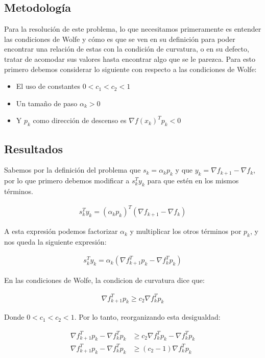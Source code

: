 \documentclass{article}
\begin{document}
\subsection{Metodología}

Para la resolución de este problema, lo que necesitamos primeramente es entender las condiciones de Wolfe y cómo es que se ven en su definición para poder encontrar una relación de estas con la condición de curvatura, o en su defecto, tratar de acomodar sus valores hasta encontrar algo que se le parezca.
Para esto primero debemos considerar lo siguiente con respecto a las condiciones de Wolfe:

\begin{itemize}
    \item El uso de constantes $0 < c_1 < c_2 < 1$
    \item Un tamaño de paso $\alpha_k > 0$
    \item Y $p_k$ como dirección de descenso es $\nabla f(x_k)^Tp_k<0$
\end{itemize}

\subsection{Resultados}
\setcounter{equation}{0}

Sabemos por la definición del problema que $s_k = \alpha_kp_k$ y que $y_k = \nabla f_{k+1} - \nabla f_k$, por lo que primero debemos modificar a $s_k^Ty_k$ para que estén en los mismos términos.

\begin{align}
    s_k^Ty_k = (\alpha_k p_k)^T(\nabla f_{k+1} - \nabla f_k)
\end{align}

A esta expresión podemos factorizar $\alpha_k$ y multiplicar los otros términos por $p_k$, y nos queda la siguiente expresión:

\begin{align}
    s_k^Ty_k = \alpha_k(\nabla f_{k+1}^Tp_k - \nabla f_k^Tp_k)
\end{align}

En las condiciones de Wolfe, la condicion de curvatura dice que:

\begin{align}
    \nabla f_{k+1}^T p_k \geq c_2 \nabla f_k^T p_k
\end{align}

Donde $0 < c_1 < c_2 < 1$. Por lo tanto, reorganizando esta desigualdad:

\begin{align}
    \nabla f_{k+1}^T p_k - \nabla f_k^T p_k &\geq c_2 \nabla f_k^T p_k - \nabla f_k^T p_k \\
    \nabla f_{k+1}^T p_k - \nabla f_k^T p_k &\geq (c_2 - 1) \nabla f_k^T p_k
\end{align}
\end{document}
